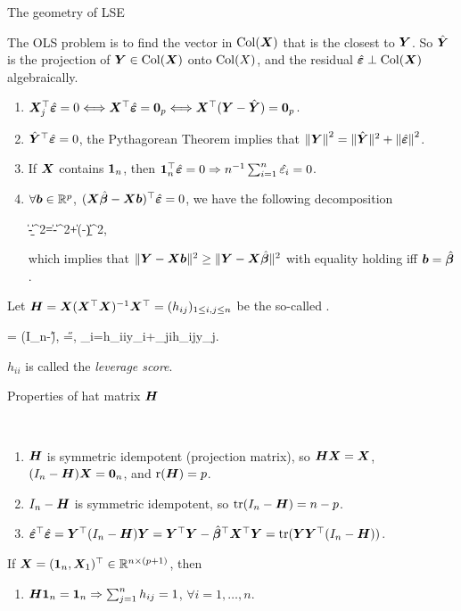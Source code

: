 \documentclass[10pt,a4paper]{book}
\begin{document}
\begin{thmbox}{The geometry of LSE}
	\begin{proposition}\label{prop:geo_LSE}
		The OLS problem is to find the vector in $\Col(\X)$ that is the closest to $\Y$.
		So $\hat{\Y}$ is the projection of $\Y\in\Col(\X)$ onto $\Col(X)$, and the residual $\hat{\bave}\perp\Col(\X)$ algebraically. 
		\begin{enumerate}
			\item $\X_j^\TT\hat{\bave}=0 \Longleftrightarrow \X^\TT\hat{\bave}=\0_p \Longleftrightarrow \X^\TT (\Y-\hat{\Y})=\0_p $.
			\item $\hat{\Y}^\TT\hat{\bave}=0$, the Pythagorean Theorem implies that $\norm{\Y}^2=\littlenorm{\hat{\Y}}^2+\norm{\hat{\bave}}^2$. 
			\item If $\X$ contains $\1_n$, then $\1_n^\TT \hat{\bave}=0 \Rightarrow n^{-1}\sum_{i=1}^{n}\hat{\varepsilon_i}=0$.
			\item $\forall \b\in\bbR^{p}$, $(\X\hat{\bab}-\X\b)^\TT \hat{\bave}=0$, we have the following decomposition
			\begin{sequation*}
				\|\Y-\X\b\|^2=\|\Y-\X\hat{\bab}\|^2+\|\X(\hat{\bab}-\b)\|^2,
			\end{sequation*} 
			which implies that $\|\Y-\X\b\|^2\geq\|\Y-\X\hat{\bab}\|^2$ with equality holding iff $\b=\hat{\bab}$. 
		\end{enumerate}
		
	\end{proposition}
\end{thmbox}
Let $\H=\X(\X^\TT \X)^{-1}\X^\TT=(h_{ij})_{1\leq i,j\leq n}$ be the so-called .

\begin{salign*}
	\hat{\bave}= (I_n-\H)\Y, \qquad
	\hat{\Y}=\H\Y, \qquad {}_i=h_{ii}y_i+\sum_{j\neq i}h_{ij}y_j.
\end{salign*}
$h_{ii}$ is called the \textit{leverage score}. 
 
\begin{thmbox}{Properties of hat matrix $\H$}
\begin{proposition}\label{prop:OLS_H}\
	\begin{enumerate}
		\item $\H$ is symmetric idempotent (projection matrix), so $\H\X=\X$, $(I_n-\H)\X=\0_n$, and $\rmr(\H)=p$.   
		\item $I_n-\H$ is symmetric idempotent, so $\tr(I_n-\H)=n-p$. 
		\item $\hat{\bave}^\TT\hat{\bave}=\Y^\TT(I_n-\H)\Y=\Y^\TT\Y-\hat{\bab}^\TT \X^\TT \Y=\tr(\Y\Y^\TT(I_n-\H))$. 
	\end{enumerate}
	If $\X=(\1_n,\X_1)^\TT\in\bbR^{n\times (p+1)}$, then 
	\begin{enumerate}
		\item $\H\1_n=\1_n\Rightarrow \sum_{j=1}^{n}h_{ij}=1$, $\forall i=1,\ldots,n$.  
	\end{enumerate}
\end{proposition}
\end{thmbox}
\end{document}
